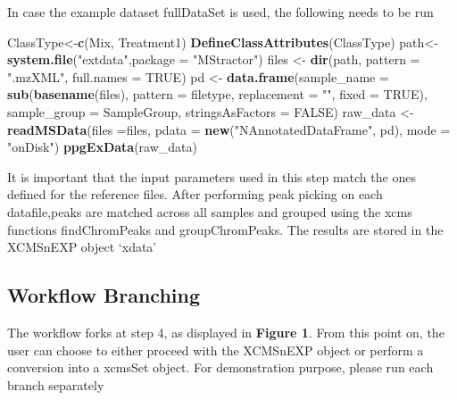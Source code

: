\documentclass[
]{article}
\newenvironment{Shaded}{\begin{snugshade}}{\end{snugshade}}
\newcommand{\DataTypeTok}[1]{\textcolor[rgb]{0.13,0.29,0.53}{#1}}
\newcommand{\KeywordTok}[1]{\textcolor[rgb]{0.13,0.29,0.53}{\textbf{#1}}}
\newcommand{\NormalTok}[1]{#1}
\newcommand{\OtherTok}[1]{\textcolor[rgb]{0.56,0.35,0.01}{#1}}
\newcommand{\StringTok}[1]{\textcolor[rgb]{0.31,0.60,0.02}{#1}}
\begin{document}
In case the example dataset fullDataSet is used, the following needs to
be run

\begin{Shaded}
\begin{Highlighting}[]
\NormalTok{ClassType<{-}}\KeywordTok{c}\NormalTok{(}\StringTok{\textquotesingle{}Mix\textquotesingle{}}\NormalTok{, }\StringTok{\textquotesingle{}Treatment1\textquotesingle{}}\NormalTok{)}
\KeywordTok{DefineClassAttributes}\NormalTok{(ClassType)}
\NormalTok{path<{-}}\KeywordTok{system.file}\NormalTok{(}\StringTok{"extdata"}\NormalTok{,}\DataTypeTok{package =} \StringTok{"MStractor"}\NormalTok{)}
\NormalTok{files <{-}}\StringTok{ }\KeywordTok{dir}\NormalTok{(path, }\DataTypeTok{pattern =} \StringTok{".mzXML"}\NormalTok{, }\DataTypeTok{full.names =} \OtherTok{TRUE}\NormalTok{)}
\NormalTok{pd <{-}}\StringTok{ }\KeywordTok{data.frame}\NormalTok{(}\DataTypeTok{sample\_name =} \KeywordTok{sub}\NormalTok{(}\KeywordTok{basename}\NormalTok{(files), }\DataTypeTok{pattern =}\NormalTok{ filetype,}
    \DataTypeTok{replacement =} \StringTok{""}\NormalTok{, }\DataTypeTok{fixed =} \OtherTok{TRUE}\NormalTok{), }\DataTypeTok{sample\_group =}\NormalTok{ SampleGroup,}
    \DataTypeTok{stringsAsFactors =} \OtherTok{FALSE}\NormalTok{)}
\NormalTok{raw\_data <{-}}\StringTok{ }\KeywordTok{readMSData}\NormalTok{(}\DataTypeTok{files =}\NormalTok{files, }\DataTypeTok{pdata =} \KeywordTok{new}\NormalTok{(}\StringTok{"NAnnotatedDataFrame"}\NormalTok{,}
\NormalTok{    pd), }\DataTypeTok{mode =} \StringTok{"onDisk"}\NormalTok{)}
\KeywordTok{ppgExData}\NormalTok{(raw\_data) }
\end{Highlighting}
\end{Shaded}

It is important that the input parameters used in this step match the
ones defined for the reference files. After performing peak picking on
each datafile,peaks are matched across all samples and grouped using the
xcms functions findChromPeaks and groupChromPeaks. The results are
stored in the XCMSnEXP object `xdata'

\hypertarget{workflow-branching}{%
\subsection{\texorpdfstring{\textbf{Workflow
Branching}}{Workflow Branching}}\label{workflow-branching}}

The workflow forks at step 4, as displayed in \textbf{Figure 1}. From
this point on, the user can choose to either proceed with the XCMSnEXP
object or perform a conversion into a xcmsSet object. For demonstration
purpose, please run each branch separately
\end{document}
